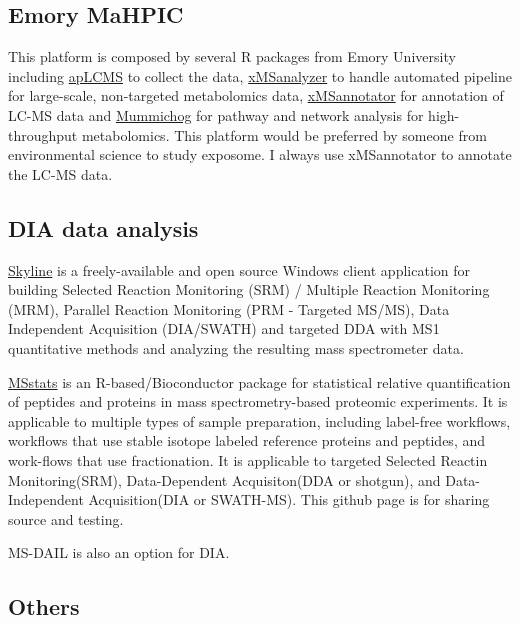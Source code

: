 \documentclass[
]{book}
\begin{document}
\hypertarget{emory-mahpic}{%
\subsection{Emory MaHPIC}\label{emory-mahpic}}

This platform is composed by several R packages from Emory University including \href{https://sourceforge.net/projects/aplcms/}{apLCMS} to collect the data, \href{https://sourceforge.net/projects/xmsanalyzer/}{xMSanalyzer} to handle automated pipeline for large-scale, non-targeted metabolomics data, \href{https://sourceforge.net/projects/xmsannotator/}{xMSannotator} for annotation of LC-MS data and \href{https://code.google.com/archive/p/atcg/wikis/mummichog_for_metabolomics.wiki}{Mummichog} for pathway and network analysis for high-throughput metabolomics. This platform would be preferred by someone from environmental science to study exposome. I always use xMSannotator to annotate the LC-MS data.

\hypertarget{dia-data-analysis}{%
\subsection{DIA data analysis}\label{dia-data-analysis}}

\href{https://skyline.ms/project/home/software/Skyline/begin.view}{Skyline} is a freely-available and open source Windows client application for building Selected Reaction Monitoring (SRM) / Multiple Reaction Monitoring (MRM), Parallel Reaction Monitoring (PRM - Targeted MS/MS), Data Independent Acquisition (DIA/SWATH) and targeted DDA with MS1 quantitative methods and analyzing the resulting mass spectrometer data.

\href{https://github.com/MeenaChoi/MSstats}{MSstats} is an R-based/Bioconductor package for statistical relative quantification of peptides and proteins in mass spectrometry-based proteomic experiments. It is applicable to multiple types of sample preparation, including label-free workflows, workflows that use stable isotope labeled reference proteins and peptides, and work-flows that use fractionation. It is applicable to targeted Selected Reactin Monitoring(SRM), Data-Dependent Acquisiton(DDA or shotgun), and Data-Independent Acquisition(DIA or SWATH-MS). This github page is for sharing source and testing.

MS-DAIL is also an option for DIA.

\hypertarget{others}{%
\subsection{Others}\label{others}}
\end{document}

